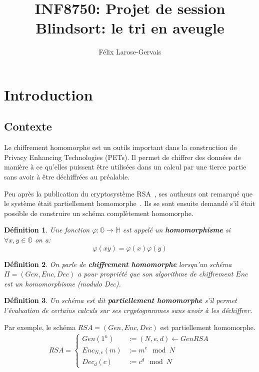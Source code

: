 \documentclass{article}
\title{INF8750: Projet de session \\ \large{Blindsort: le tri en aveugle}}
\author{Félix Larose-Gervais}
\newtheorem{definition}{Définition}
\begin{document}
\maketitle
\newpage
\tableofcontents
\newpage

\section{Introduction}

\subsection{Contexte}

Le chiffrement homomorphe est un outils important dans la construction de Privacy Enhancing Technologies (PETs). Il permet de chiffrer des données de manière à ce qu'elles puissent être utilisées dans un calcul par une tierce partie sans avoir à être déchiffrées au préalable.

Peu après la publication du cryptosystème RSA~\cite{rivest_method_1978}, ses autheurs ont remarqué que le système était partiellement homomorphe~\cite{Rivest1978}. Ils se sont ensuite demandé s'il était possible de construire un schéma complètement homomorphe.

\begin{definition}
    Une fonction $\varphi : \mathbb{G} \to \mathbb{H}$ est appelé un \textbf{homomorphisme} si $\forall x, y \in \mathbb{G}$ on a:
    \[ \varphi(xy) = \varphi(x)\varphi(y)\]
\end{definition}

\begin{definition}
    On parle de \textbf{chiffrement homomorphe} lorsqu'un schéma $\Pi = (Gen, Enc, Dec)$ a pour propriété que son algorithme de chiffrement $Enc$ est un homomorphisme (modulo Dec).
\end{definition}

\begin{definition}
    Un schéma est dit \textbf{partiellement homomorphe} s'il permet l'évaluation de certains calculs sur ses cryptogrammes sans avoir à les déchiffrer.
\end{definition}

Par exemple, le schéma $RSA = (Gen, Enc, Dec)$ est partiellement homomorphe.
\begin{align*}
    RSA = \begin{cases}
        Gen(1^n) &:= (N, e, d) \gets GenRSA \\
        Enc_{N, e}(m) &:= m^e \mod N \\
        Dec_d(c) &:= c^d \mod N
    \end{cases}
\end{align*}
\end{document}
